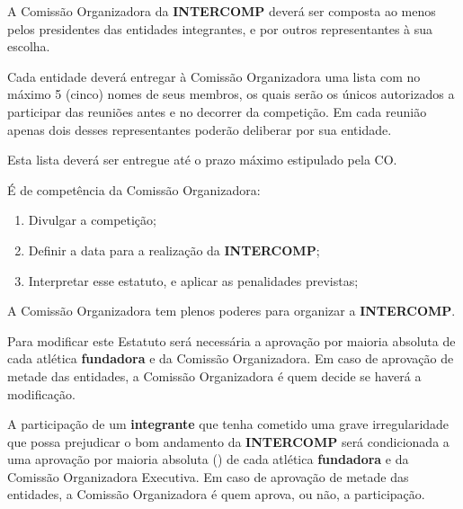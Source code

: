 \begin{article}
	A Comissão Organizadora da \textbf{INTERCOMP} deverá ser composta ao menos pelos presidentes das entidades integrantes, e por outros representantes à sua escolha.

	\begin{xparagraph}
		Cada entidade deverá entregar à Comissão Organizadora uma lista com no máximo 5 (cinco) nomes de seus membros, os quais serão os únicos autorizados a participar das reuniões antes e no decorrer da competição. Em cada reunião apenas dois desses representantes poderão deliberar por sua entidade.
	\end{xparagraph}

	\begin{xparagraph}
		Esta lista deverá ser entregue até o prazo máximo estipulado pela CO.
	\end{xparagraph}

	\begin{xparagraph}
		É de competência da Comissão Organizadora:
		\begin{enumerate}[noitemsep]
			\item Divulgar a competição;
			\item Definir a data para a realização da \textbf{INTERCOMP};
			\item Interpretar esse estatuto, e aplicar as penalidades previstas;
		\end{enumerate}
	\end{xparagraph}
\end{article}

\begin{article}
	A Comissão Organizadora tem plenos poderes para organizar a \textbf{INTERCOMP}.

	\begin{xparagraph}
		Para modificar este Estatuto será necessária a aprovação por maioria absoluta de cada atlética \textbf{fundadora} e da Comissão Organizadora. Em caso de aprovação de metade das entidades, a Comissão Organizadora é quem decide se haverá a modificação.
	\end{xparagraph}

	\begin{xparagraph}
		A participação de um \textbf{integrante} que tenha cometido uma grave irregularidade que possa prejudicar o bom andamento da \textbf{INTERCOMP} será condicionada a uma aprovação por maioria absoluta () de cada atlética \textbf{fundadora} e da Comissão Organizadora Executiva. Em caso de aprovação de metade das entidades, a Comissão Organizadora é quem aprova, ou não, a participação.
	\end{xparagraph}
\end{article}


